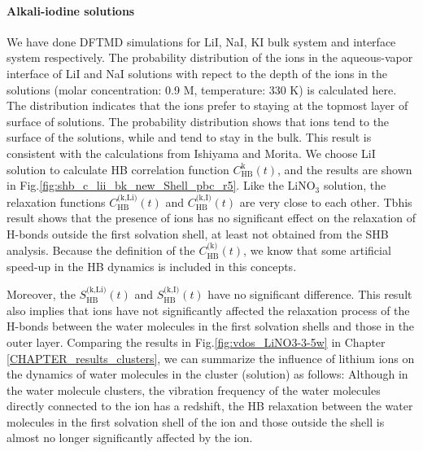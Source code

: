 \paragraph{Alkali-iodine solutions}
We have done DFTMD simulations for LiI, NaI, KI bulk system and interface system respectively.
% 
The probability distribution of the ions in the aqueous-vapor interface of LiI and NaI solutions with repect to the depth 
of the ions in the solutions (molar concentration: 0.9 M, temperature: 330 K) is calculated here. 
The distribution indicates that the \I ions prefer to staying at the topmost layer of surface of solutions.
 The probability distribution shows that \I ions tend to the surface of the solutions, while \Na and \Li tend to stay in the bulk. 
This result is consistent with the calculations from Ishiyama and Morita\cite{TI07,Ishiyama2014}.
We choose LiI solution to calculate HB correlation function $C^\text{k}_\text{HB}(t)$,
and the results are shown in Fig.\ref{fig:shb_c_lii_bk_new_Shell_pbc_r5}. 
Like the LiNO$_3$ solution, the relaxation functions $C^\text{(k,Li)}_\text{HB}(t)$ and 
$C^\text{(k,I)}_\text{HB}(t)$ are very close to each other. 
Tbhis result shows that the presence of ions has no significant effect on the relaxation of H-bonds outside the first solvation shell,
at least not obtained from the SHB analysis. Because the definition of the $C^\text{(k)}_\text{HB}(t)$, 
we know that some artificial speed-up in the HB dynamics is included in this concepts.


Moreover, the $S^\text{(k,Li)}_\text{HB}(t)$ and $S^\text{(k,I)}_\text{HB}(t)$ have no significant difference. 
This result also implies that \Li ions have not significantly affected the relaxation process of the H-bonds 
between the water molecules in the first solvation shells and those in the outer layer. 
Comparing the results in Fig.\thinspace\ref{fig:vdos_LiNO3-3-5w} in Chapter \ref{CHAPTER_results_clusters},
we can summarize the influence of lithium ions on the dynamics of water molecules in the cluster (solution) as follows:
Although in the water molecule clusters, the vibration frequency of the water molecules directly connected to the \Li ion has a redshift, 
the HB relaxation between the water molecules in the first solvation shell of the ion and those outside the shell 
is almost no longer significantly affected by the ion. 


